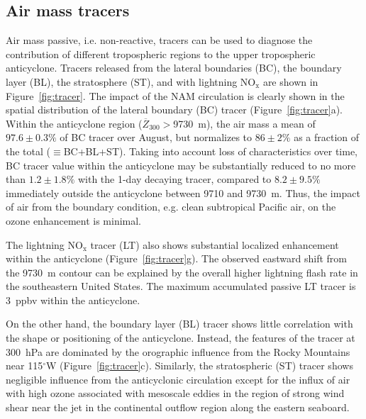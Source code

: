 \subsection{Air mass tracers}\label{sect:diag/passive}

Air mass passive, i.e. non-reactive, tracers can be used to diagnose the contribution of different tropospheric
regions to the upper tropospheric anticyclone. Tracers released from the lateral
boundaries (BC), the boundary layer (BL), the stratosphere (ST), and with lightning
NO$_{\mathrm{x}}$ are shown in Figure~\ref{fig:tracer}. The impact of the NAM circulation is
clearly shown in the spatial distribution of the lateral boundary (BC) tracer
(Figure~\ref{fig:tracer}a). Within the anticyclone region ($\overline Z_{300}>$9730~m),
the air mass a mean of $97.6\pm0.3\%$ of BC tracer over August, but normalizes
to $86\pm2\%$ as a fraction of the total ($\equiv$BC+BL+ST). Taking into account
loss of characteristics over time, BC tracer value within the anticyclone may be substantially
reduced to no more than $1.2\pm1.8\%$ with the 1-day decaying tracer, compared to
$8.2\pm9.5\%$ immediately outside the anticyclone between 9710 and 9730~m.
Thus, the impact of air from the boundary
condition, e.g. clean subtropical Pacific air, on the ozone enhancement is minimal.

The lightning NO$_{\mathrm{x}}$ tracer (LT) also shows substantial localized
enhancement within the anticyclone (Figure~\ref{fig:tracer}g). The observed eastward
shift from the 9730~m contour can be explained by the overall higher lightning
flash rate in the southeastern United States. The maximum accumulated passive
LT tracer is 3~ppbv within the anticyclone.

On the other hand, the boundary layer (BL) tracer shows little correlation with
the shape or positioning of the anticyclone. Instead, the features of the tracer
at 300~hPa are dominated by the orographic influence from the Rocky Mountains
near 115$^\circ$W (Figure~\ref{fig:tracer}c). Similarly, the stratospheric (ST) tracer
shows negligible influence from the anticyclonic circulation except for the influx
of air with high ozone associated with mesoscale eddies in the region of strong
wind shear near the jet in the continental outflow region along the eastern seaboard.

